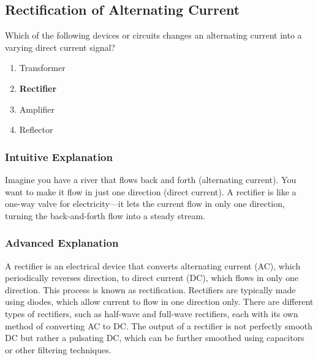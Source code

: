 \subsection{Rectification of Alternating Current}
\label{T6D01}

\begin{tcolorbox}[colback=gray!10!white,colframe=black!75!black,title=T6D01]
Which of the following devices or circuits changes an alternating current into a varying direct current signal?
\begin{enumerate}[noitemsep]
    \item Transformer
    \item \textbf{Rectifier}
    \item Amplifier
    \item Reflector
\end{enumerate}
\end{tcolorbox}

\subsubsection*{Intuitive Explanation}
Imagine you have a river that flows back and forth (alternating current). You want to make it flow in just one direction (direct current). A rectifier is like a one-way valve for electricity—it lets the current flow in only one direction, turning the back-and-forth flow into a steady stream.

\subsubsection*{Advanced Explanation}
A rectifier is an electrical device that converts alternating current (AC), which periodically reverses direction, to direct current (DC), which flows in only one direction. This process is known as rectification. Rectifiers are typically made using diodes, which allow current to flow in one direction only. There are different types of rectifiers, such as half-wave and full-wave rectifiers, each with its own method of converting AC to DC. The output of a rectifier is not perfectly smooth DC but rather a pulsating DC, which can be further smoothed using capacitors or other filtering techniques.